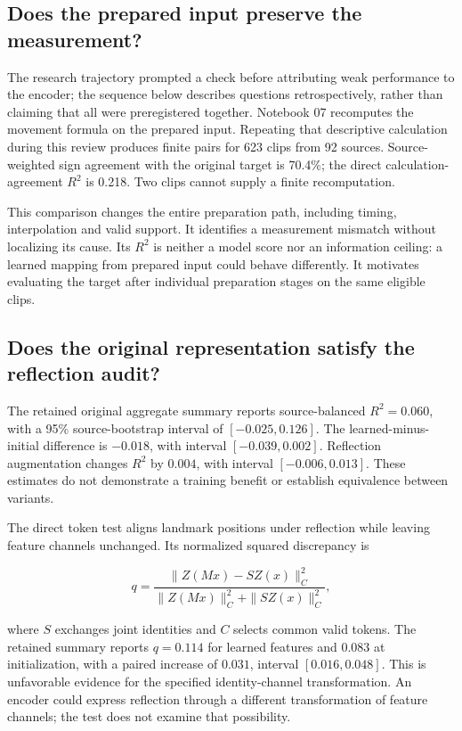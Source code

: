 \documentclass{article}
\begin{document}
\subsection{Does the prepared input preserve the measurement?}\label{does-the-prepared-input-preserve-the-measurement}

The research trajectory prompted a check before attributing weak performance to the encoder; the sequence below describes questions retrospectively, rather than claiming that all were preregistered together. Notebook 07 recomputes the movement formula on the prepared input. Repeating that descriptive calculation during this review produces finite pairs for 623 clips from 92 sources. Source-weighted sign agreement with the original target is 70.4\%; the direct calculation-agreement \(R^2\) is 0.218. Two clips cannot supply a finite recomputation.

This comparison changes the entire preparation path, including timing, interpolation and valid support. It identifies a measurement mismatch without localizing its cause. Its \(R^2\) is neither a model score nor an information ceiling: a learned mapping from prepared input could behave differently. It motivates evaluating the target after individual preparation stages on the same eligible clips.

\subsection{Does the original representation satisfy the reflection audit?}\label{does-the-original-representation-satisfy-the-reflection-audit}

The retained original aggregate summary reports source-balanced \(R^2=0.060\), with a 95\% source-bootstrap interval of \([-0.025,0.126]\). The learned-minus-initial difference is \(-0.018\), with interval \([-0.039,0.002]\). Reflection augmentation changes \(R^2\) by \(0.004\), with interval \([-0.006,0.013]\). These estimates do not demonstrate a training benefit or establish equivalence between variants.

The direct token test aligns landmark positions under reflection while leaving feature channels unchanged. Its normalized squared discrepancy is

\[
q=\frac{\|Z(Mx)-SZ(x)\|_C^2}
{\|Z(Mx)\|_C^2+\|SZ(x)\|_C^2},
\]

where \(S\) exchanges joint identities and \(C\) selects common valid tokens. The retained summary reports \(q=0.114\) for learned features and \(0.083\) at initialization, with a paired increase of \(0.031\), interval \([0.016,0.048]\). This is unfavorable evidence for the specified identity-channel transformation. An encoder could express reflection through a different transformation of feature channels; the test does not examine that possibility.
\end{document}
